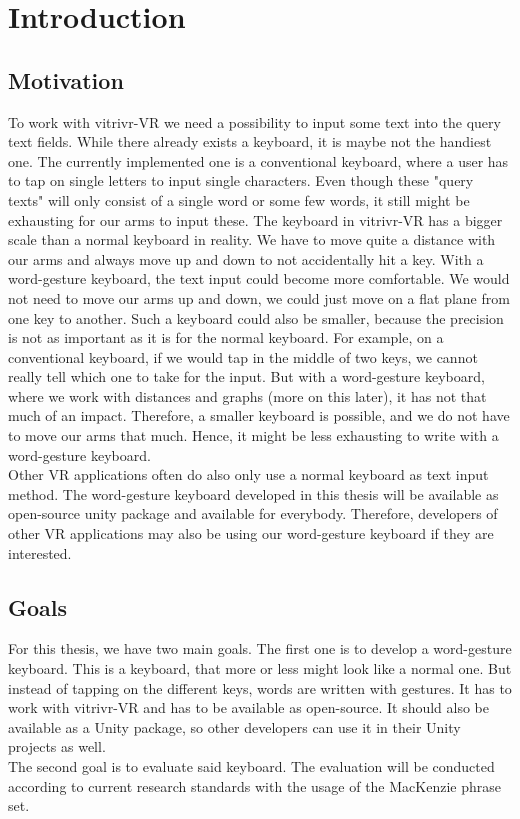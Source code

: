 \chapter{Introduction}

\section{Motivation}
To work with vitrivr-VR we need a possibility to input some text into the query text fields. While there already exists a keyboard, it is maybe not the handiest one. The currently implemented one is a conventional keyboard, where a user has to tap on single letters to input single characters. Even though these "query texts" will only consist of a single word or some few words, it still might be exhausting for our arms to input these. The keyboard in vitrivr-VR has a bigger scale than a normal keyboard in reality. We have to move quite a distance with our arms and always move up and down to not accidentally hit a key. With a word-gesture keyboard, the text input could become more comfortable. We would not need to move our arms up and down, we could just move on a flat plane from one key to another. Such a keyboard could also be smaller, because the precision is not as important as it is for the normal keyboard. For example, on a conventional keyboard, if we would tap in the middle of two keys, we cannot really tell which one to take for the input. But with a word-gesture keyboard, where we work with distances and graphs (more on this later), it has not that much of an impact. Therefore, a smaller keyboard is possible, and we do not have to move our arms that much. Hence, it might be less exhausting to write with a word-gesture keyboard.\\
Other VR applications often do also only use a normal keyboard as text input method. The word-gesture keyboard developed in this thesis will be available as open-source unity package and available for everybody. Therefore, developers of other VR applications may also be using our word-gesture keyboard if they are interested.

\section{Goals}
For this thesis, we have two main goals. The first one is to develop a word-gesture keyboard. This is a keyboard, that more or less might look like a normal one. But instead of tapping on the different keys, words are written with gestures. It has to work with vitrivr-VR and has to be available as open-source. It should also be available as a Unity package, so other developers can use it in their Unity projects as well. \\
The second goal is to evaluate said keyboard. The evaluation will be conducted according to current research standards with the usage of the MacKenzie phrase set.
